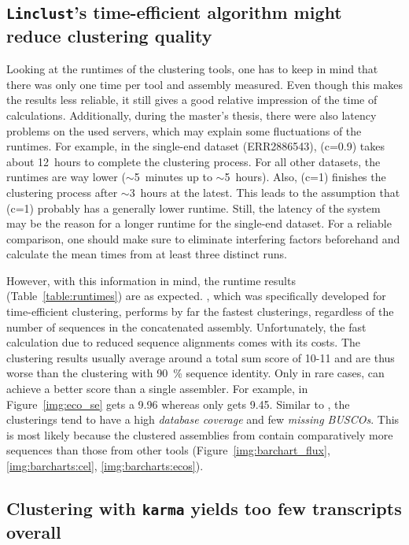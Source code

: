 \documentclass[12pt,a4paper,english]{article}
\begin{document}
	\subsection{\texttt{Linclust}'s time-efficient algorithm might reduce clustering quality}
	    Looking at the runtimes of the clustering tools, one has to keep in mind that there was only one time per tool and assembly measured. Even though this makes the results less reliable, it still gives a good relative impression of the time of calculations.
		Additionally, during the master's thesis, there were also latency problems on the used servers, which may explain some fluctuations of the runtimes.
		For example, in the single-end \celegans dataset (ERR2886543), \cdhit (c=0.9) takes about 12~hours to complete the clustering process. For all other datasets, the runtimes are way lower ($\sim$5~minutes up to $\sim$5~hours). Also, \cdhit (c=1) finishes the clustering process after $\sim$3~hours at the latest. This leads to the assumption that \cdhit (c=1) probably has a generally lower runtime. Still, the latency of the system may be the reason for a longer runtime for the single-end \celegans dataset.    
		For a reliable comparison, one should make sure to eliminate interfering factors beforehand and calculate the mean times from at least three distinct runs.
		
		However, with this information in mind, the runtime results (Table~\ref{table:runtimes}) are as expected. \linclust, which was specifically developed for time-efficient clustering, performs by far the fastest clusterings, regardless of the number of sequences in the concatenated assembly.
		Unfortunately, the fast calculation due to reduced sequence alignments comes with its costs.
		The clustering results usually average around a total sum score of 10-11 and are thus worse than the \cdhit clustering with 90~\% sequence identity.
		Only in rare cases, \linclust can achieve a better score than a single assembler. For example, in Figure~\ref{img:eco_se} \linclust gets a 9.96 whereas \spades only gets 9.45. Similar to \cdhit, the clusterings tend to have a high \textit{database coverage} and few \textit{missing BUSCOs}. This is most likely because the clustered assemblies from \linclust contain comparatively more sequences than those from other tools (Figure~\ref{img:barchart_flux}, \ref{img:barcharts:cel}, \ref{img:barcharts:ecos}).
		
	\subsection{Clustering with \texttt{karma} yields too few transcripts overall}
\end{document}
